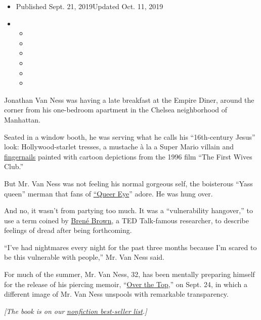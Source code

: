 \begin{itemize}
\item
  Published Sept. 21, 2019Updated Oct. 11, 2019
\item
  \begin{itemize}
  \item
  \item
  \item
  \item
  \item
  \item
  \end{itemize}
\end{itemize}

Jonathan Van Ness was having a late breakfast at the Empire Diner,
around the corner from his one-bedroom apartment in the Chelsea
neighborhood of Manhattan.

Seated in a window booth, he was serving what he calls his
``16th-century Jesus'' look: Hollywood-starlet tresses, a mustache à la
a Super Mario villain and
\href{https://www.instagram.com/p/B1oDLPLA_Zr/}{fingernails} painted
with cartoon depictions from the 1996 film ``The First Wives Club.''

But Mr. Van Ness was not feeling his normal gorgeous self, the
boisterous ``Yass queen'' merman that fans of
\href{https://www.nytimes.com/2018/02/07/arts/television/queer-eye-netflix-review.html}{``Queer
Eye}'' adore. He was hung over.

And no, it wasn't from partying too much. It was a ``vulnerability
hangover,'' to use a term coined by
\href{https://www.ted.com/talks/brene_brown_on_vulnerability?utm_campaign=tedspread\&utm_medium=referral\&utm_source=tedcomshare}{Brené
Brown}, a TED Talk-famous researcher, to describe feelings of dread
after being forthcoming.

``I've had nightmares every night for the past three months because I'm
scared to be this vulnerable with people,'' Mr. Van Ness said.

For much of the summer, Mr. Van Ness, 32, has been mentally preparing
himself for the release of his piercing memoir,
``\href{https://www.harpercollins.com/9780062906373/over-the-top/}{Over
the Top},'' on Sept. 24, in which a different image of Mr. Van Ness
unspools with remarkable transparency.

\emph{{[}The book is on our}
\href{https://www.nytimes.com/2019/10/11/books/review/jonathan-van-nesss-gorgeous-memoir-is-a-best-seller.html}{\emph{nonfiction
best-seller list}}\emph{.{]}}

